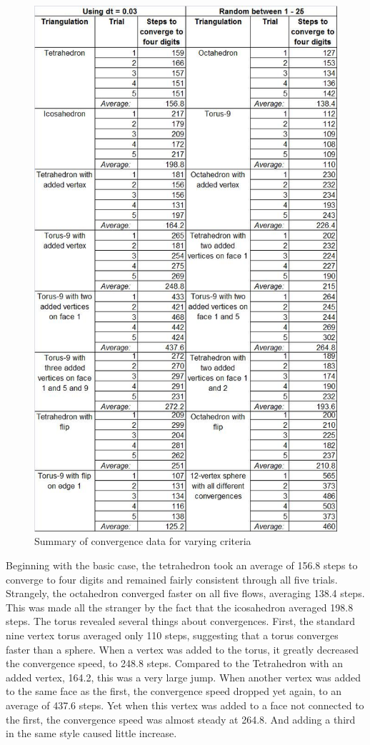 \documentclass[12pt]{article}
\begin{document}
\begin{figure}
\centering
\includegraphics[scale = 0.7]{Pictures/ConvergenceTable.png}
\caption{Summary of convergence data for varying criteria}
\label{fig:conv}
\end{figure}

 Beginning with the basic case, the tetrahedron took an average of 156.8 steps to converge to four digits and remained fairly consistent through all five trials. Strangely, the octahedron converged faster on all five flows, averaging 138.4 steps. This was made all the stranger by the fact that the icosahedron averaged 198.8 steps. The torus revealed several things about convergences. First, the standard nine vertex torus averaged only 110 steps, suggesting that a torus converges faster than a sphere. When a vertex was added to the torus, it greatly decreased the convergence speed, to 248.8 steps. Compared to the Tetrahedron with an added vertex, 164.2, this was a very large jump. When another vertex was added to the same face as the first, the convergence speed dropped yet again, to an average of 437.6 steps. Yet when this vertex was added to a face not connected to the first, the convergence speed was almost steady at 264.8. And adding a third in the same style caused little increase.
\end{document}
